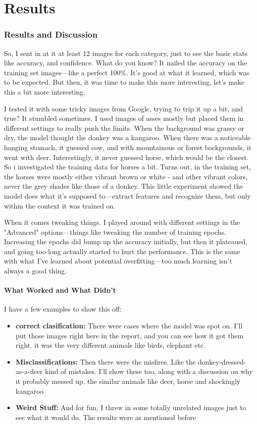 \chapter{Results}
\subsection{Results and Discussion}
So, I sent in at it at least 12 images for each category, just to see the basic stats like accuracy, and confidence. What do you know? It nailed the accuracy on the training set images—like a perfect 100\%. It's good at what it learned, which was to be expected. But then, it was time to make this more interesting, let’s make this a bit more interesting. 

I tested it with some tricky images from Google, trying to trip it up a bit, and true? It stumbled sometimes. I used images of asses mostly but placed them in different settings to really push the limits. When the background was grassy or dry, the model thought the donkey was a kangaroo. When there was a noticeable hanging stomach, it guessed cow, and with mountainous or forest backgrounds, it went with deer. Interestingly, it never guessed horse, which would be the closest. So i investigated the training data for horses a bit. Turns out, in the training set, the horses were mostly either vibrant brown or white - and other vibrant colors, never the grey shades like those of a donkey. This little experiment showed the model does what it’s supposed to—extract features and recognize them, but only within the context it was trained on.

When it comes tweaking things. I played around with different settings in the "Advanced" options—things like tweaking the number of training epochs. Increasing the epochs did bump up the accuracy initially, but then it plateaued, and going too long actually started to hurt the performance. This is the same with what I've learned about potential overfitting—too much learning isn't always a good thing.

\subsubsection{What Worked and What Didn't}
I have a few examples to show this off:
\begin{itemize}
    \item \textbf{correct clasification:} There were cases where the model was spot on. I’ll put those images right here in the report, and you can see how it got them right. it was the very different animals like birds, elephant etc.
    \item \textbf{Misclassifications:} Then there were the misfires. Like the donkey-dressed-as-a-deer kind of mistakes. I’ll show these too, along with a discussion on why it probably messed up. the similar animals like deer, horse and shockingly kangaroo
    \item \textbf{Weird Stuff:} And for fun, I threw in some totally unrelated images just to see what it would do. The results were as mentioned before
\end{itemize}

